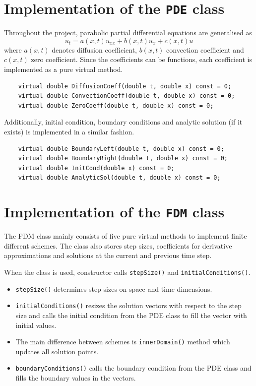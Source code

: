 \documentclass[12pt, oneside]{book}
\theoremstyle{plain}
\theoremstyle{definition}
\begin{document}
\appendix

\chapter{Implementation of the {\tt PDE} class} \label{PDEClass}
Throughout the project, parabolic partial differential equations  are generalised as
\begin{equation} 
 u_t = a(x, t)  u_{xx} + b(x, t) u_x + c(x, t) u
\end{equation}
where $a(x, t)$ denotes diffusion coefficient,  $b(x, t)$ convection coefficient and $c(x, t)$ zero coefficient. Since the coefficients can be functions, each coefficient is implemented as a pure virtual method.

\begin{verbatim}
	virtual double DiffusionCoeff(double t, double x) const = 0;
	virtual double ConvectionCoeff(double t, double x) const = 0;
	virtual double ZeroCoeff(double t, double x) const = 0;
\end{verbatim}

Additionally, initial condition, boundary conditions and analytic solution (if it exists) is implemented in a similar fashion. 

\begin{verbatim}
	virtual double BoundaryLeft(double t, double x) const = 0;
	virtual double BoundaryRight(double t, double x) const = 0;
	virtual double InitCond(double x) const = 0;
	virtual double AnalyticSol(double t, double x) const = 0;
\end{verbatim}


\chapter{Implementation of the {\tt FDM} class} \label{FDMClass}
The FDM class mainly consists of five pure virtual methods to implement finite different schemes. The class also stores step sizes, coefficients for derivative approximations and solutions at the current and previous time step. 

When the class is used, constructor calls \verb!stepSize()! and \verb!initialConditions()!.  
\begin{itemize}
\item \verb!stepSize()! determines step sizes on space and time dimensions. 
\item \verb!initialConditions()!  resizes the solution vectors with respect to the step size and calls the initial condition from the PDE class to fill the vector with initial values.
\item The main difference between schemes is \verb!innerDomain()!  method which updates all solution points. 
\item \verb!boundaryConditions()!  calls the boundary condition from the PDE class and fills the boundary values in the vectors. 
\end{itemize}
\end{document}
